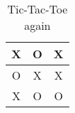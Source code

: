 \begin{table}[h]          %
	\caption{Tic-Tac-Toe again} %
	\label{table:some-table}    %
	\centering                  %
	
	\begin{tabular}{c | c | c}
		X & O & X \\
		\hline
		O & X & X \\
		\hline
		X & O & O \\
	\end{tabular}
\end{table}
